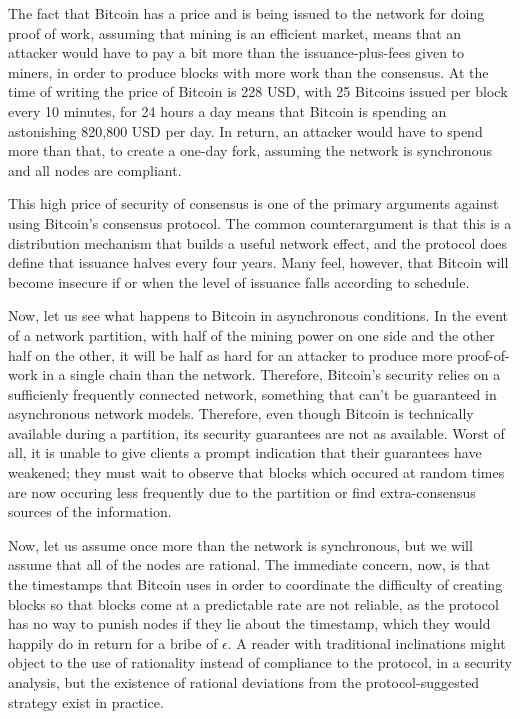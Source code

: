 \documentclass[11pt,a4paper]{article}
\theoremstyle{plain}
\theoremstyle{definition}
\begin{document}
The fact that Bitcoin has a price and is being issued to the network for doing proof of work, assuming that mining is an efficient market, means that an attacker would have to pay a bit more than the issuance-plus-fees given to miners, in order to produce blocks with more work than the consensus. At the time of writing the price of Bitcoin is 228 USD, with 25 Bitcoins issued per block every 10 minutes, for 24 hours a day means that Bitcoin is spending an astonishing 820,800 USD per day. In return, an attacker would have to spend more than that, to create a one-day fork, assuming the network is synchronous and all nodes are compliant.

This high price of security of consensus is one of the primary arguments against using Bitcoin's consensus protocol. The common counterargument is that this is a distribution mechanism that builds a useful network effect, and the protocol does define that issuance halves every four years. Many feel, however, that Bitcoin will become insecure if or when the level of issuance falls according to schedule.

Now, let us see what happens to Bitcoin in asynchronous conditions. In the event of a network partition, with half of the mining power on one side and the other half on the other, it will be half as hard for an attacker to produce more proof-of-work in a single chain than the network. Therefore, Bitcoin's security relies on a sufficienly frequently connected network, something that can't be guaranteed in asynchronous network models. Therefore, even though Bitcoin is technically available during a partition, its security guarantees are not as available. Worst of all, it is unable to give clients a prompt indication that their guarantees have weakened; they must wait to observe that blocks which occured at random times are now occuring less frequently due to the partition or find extra-consensus sources of the information.

Now, let us assume once more than the network is synchronous, but we will assume that all of the nodes are rational. The immediate concern, now, is that the timestamps that Bitcoin uses in order to coordinate the difficulty of creating blocks so that blocks come at a predictable rate are not reliable, as the protocol has no way to punish nodes if they lie about the timestamp, which they would happily do in return for a bribe of $\epsilon$. A reader with traditional inclinations might object to the use of rationality instead of compliance to the protocol, in a security analysis, but the existence of rational deviations from the protocol-suggested strategy exist in practice. 
\end{document}
